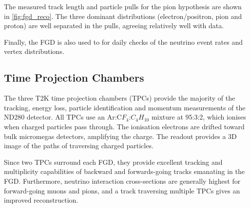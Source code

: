 The measured track length and particle pulls for the pion hypothesis are shown in \autoref{fig:fgd_reco}. The three dominant distributions (electron/positron, pion and proton) are well separated in the pulls, agreeing relatively well with data.

Finally, the FGD is also used to for daily checks of the neutrino event rates and vertex distributions.

\subsection{Time Projection Chambers}
The three T2K time projection chambers (TPCs)\cite{t2k_tpc} provide the majority of the tracking, energy loss, particle identification and momentum measurements of the ND280 detector. All TPCs use an Ar:C$F_4$:$C_4H_10$ mixture at 95:3:2, which ionises when charged particles pass through. The ionisation electrons are drifted toward bulk micromegas detectors, amplifying the charge. The readout provides a 3D image of the paths of traversing charged particles.

Since two TPCs surround each FGD, they provide excellent tracking and multiplicity capabilities of backward and forwards-going tracks emanating in the FGD. Furthermore, neutrino interaction cross-sections are generally highest for forward-going muons and pions, and a track traversing multiple TPCs gives an improved reconstruction.

